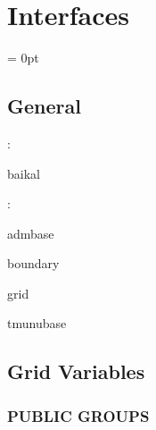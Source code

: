 \section{Interfaces} 


\parskip = 0pt

\vspace{3mm} \subsection*{General}

: 

baikal
\vspace{2mm}

: 

admbase

boundary

grid

tmunubase
\vspace{2mm}
\subsection*{Grid Variables}
\vspace{5mm}\subsubsection{PUBLIC GROUPS}

\vspace{5mm}

